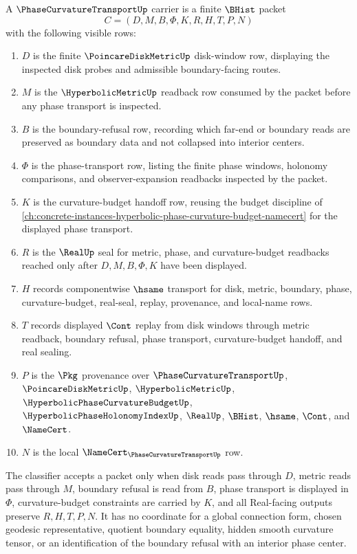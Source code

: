 \begin{definition}
\label{def:phase-curvature-transport-carrier}
A $\PhaseCurvatureTransportUp$ carrier is a finite $\BHist$ packet
$$
C=(D,M,B,\Phi,K,R,H,T,P,N)
$$
with the following visible rows:
\begin{enumerate}
\item $D$ is the finite $\PoincareDiskMetricUp$ disk-window row, displaying the inspected disk probes and admissible boundary-facing routes.
\item $M$ is the $\HyperbolicMetricUp$ readback row consumed by the packet before any phase transport is inspected.
\item $B$ is the boundary-refusal row, recording which far-end or boundary reads are preserved as boundary data and not collapsed into interior centers.
\item $\Phi$ is the phase-transport row, listing the finite phase windows, holonomy comparisons, and observer-expansion readbacks inspected by the packet.
\item $K$ is the curvature-budget handoff row, reusing the budget discipline of \autoref{ch:concrete-instances-hyperbolic-phase-curvature-budget-namecert} for the displayed phase transport.
\item $R$ is the $\RealUp$ seal for metric, phase, and curvature-budget readbacks reached only after $D,M,B,\Phi,K$ have been displayed.
\item $H$ records componentwise $\hsame$ transport for disk, metric, boundary, phase, curvature-budget, real-seal, replay, provenance, and local-name rows.
\item $T$ records displayed $\Cont$ replay from disk windows through metric readback, boundary refusal, phase transport, curvature-budget handoff, and real sealing.
\item $P$ is the $\Pkg$ provenance over $\PhaseCurvatureTransportUp$, $\PoincareDiskMetricUp$, $\HyperbolicMetricUp$, $\HyperbolicPhaseCurvatureBudgetUp$, $\HyperbolicPhaseHolonomyIndexUp$, $\RealUp$, $\BHist$, $\hsame$, $\Cont$, and $\NameCert$.
\item $N$ is the local $\NameCert_{\PhaseCurvatureTransportUp}$ row.
\end{enumerate}
The classifier accepts a packet only when disk reads pass through $D$, metric reads pass through $M$, boundary refusal is read from $B$, phase transport is displayed in $\Phi$, curvature-budget constraints are carried by $K$, and all Real-facing outputs preserve $R,H,T,P,N$. It has no coordinate for a global connection form, chosen geodesic representative, quotient boundary equality, hidden smooth curvature tensor, or an identification of the boundary refusal with an interior phase center.
\end{definition}

